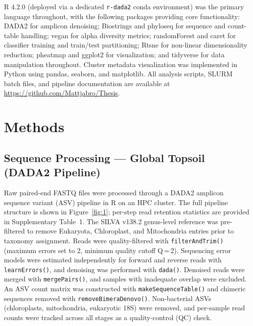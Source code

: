 \documentclass[12pt, oneside]{report}
\begin{document}
R 4.2.0 (deployed via a dedicated \texttt{r-dada2} conda environment) was the primary
language throughout, with the following packages providing core functionality: DADA2\cite{callahan2016} for amplicon denoising; Biostrings and phyloseq\cite{mcmurdie2013} for sequence and count-table handling; vegan\cite{dixon2003} for alpha diversity metrics; randomForest\cite{breiman2001} and caret for classifier training and train/test partitioning; Rtsne\cite{maaten2008} for non-linear dimensionality reduction;
pheatmap and ggplot2 for visualization; and tidyverse for data manipulation throughout.
Cluster metadata visualization was implemented in Python using pandas, seaborn, and
matplotlib. All analysis scripts, SLURM batch files, and pipeline documentation are available at \url{https://github.com/Mattjabro/Thesis}.

\chapter{Methods}

\section{Sequence Processing — Global Topsoil (DADA2 Pipeline)}
\label{sec:dada2}

Raw paired-end FASTQ files were processed through a DADA2 amplicon sequence variant
(ASV) pipeline in R on an HPC cluster. The full pipeline structure is shown in
Figure~\ref{fig:1}; per-step read retention statistics are provided in Supplementary Table~1.
The SILVA v138.2 genus-level reference\cite{quast2013} was pre-filtered
to remove Eukaryota, Chloroplast, and Mitochondria entries prior to taxonomy assignment.
Reads were quality-filtered with \texttt{filterAndTrim()} (maximum errors set to 2, minimum
quality cutoff Q\,=\,2). Sequencing error models were estimated independently for forward and
reverse reads with \texttt{learnErrors()}, and denoising was performed with \texttt{dada()}.
Denoised reads were merged with \texttt{mergePairs()}, and samples with inadequate overlap
were excluded. An ASV count matrix was constructed with \texttt{makeSequenceTable()} and
chimeric sequences removed with \texttt{removeBimeraDenovo()}. Non-bacterial ASVs
(chloroplasts, mitochondria, eukaryotic 18S) were removed, and per-sample read counts were
tracked across all stages as a quality-control (QC) check.
\end{document}
